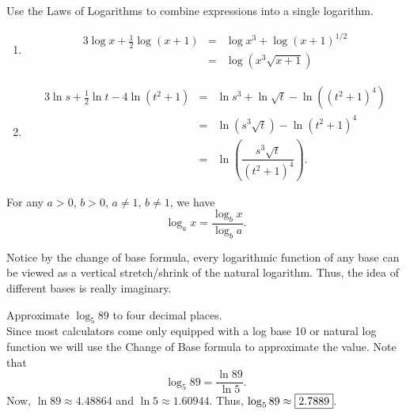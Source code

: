 \documentclass{book}
\begin{document}
\begin{Exam} Use the Laws of Logarithms to combine expressions into a single logarithm.
\begin{enumerate}
\item \mbox{}\vspace{-25pt} \begin{eqnarray*}
       3\log x + \frac{1}{2}\log(x+1) & = & \log x^3 + \log(x+1)^{1/2}\\
                                      & = & \log\left(x^3\sqrt{x+1}\right)
      \end{eqnarray*}
\item \mbox{}\vspace{-25pt} \begin{eqnarray*}
       3\ln s + \frac{1}{2}\ln t - 4 \ln\left(t^2+1\right) & = & \ln s^3 + \ln\sqrt{t} - \ln\left(\left(t^2+1\right)^4\right)\\
                                                           & = & \ln\left(s^3\sqrt{t}\right) - \ln\left(t^2+1\right)^4\\
                                                           & = & \ln\left(\dfrac{s^3\sqrt{t}}{\left(t^2+1\right)^4}\right).
      \end{eqnarray*}
\end{enumerate}
\end{Exam}

\begin{Thm}\label{eq:ChangeBase} For any $a > 0$, $b>0$, $a\neq 1$, $b\neq 1$, we have \[\log_ax = \dfrac{\log_b x}{\log_b a}.\]\end{Thm}\vs

Notice by the change of base formula, every logarithmic function of any base can be viewed as a vertical stretch/shrink of the natural logarithm. Thus, the idea of different bases is really imaginary.

\begin{Exam} Approximate $\log_5 89$ to four decimal places. \\

Since most calculators come only equipped with a log base 10 or natural log function we will use the Change of Base formula to approximate the value. Note that 
\[\log_5 89 = \dfrac{\ln 89}{\ln 5}.\] Now, $\ln 89\approx 4.48864$ and $\ln 5 \approx 1.60944$. Thus, $\log_589 \approx \fbox{$2.7889$}$. 
\end{Exam}\vs
\end{document}
